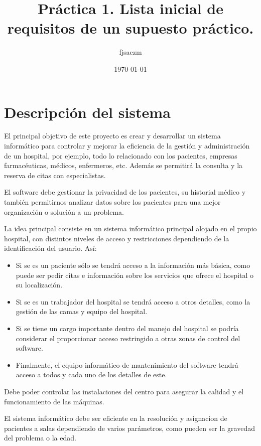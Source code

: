 \documentclass[11pt]{article}
\author{fjsaezm}
\date{\today}
\title{Práctica 1. Lista inicial de requisitos de un supuesto práctico.}
\begin{document}
\maketitle
\tableofcontents

\section{Descripción del sistema}
\label{sec-1}

El principal objetivo de este proyecto es crear y desarrollar un sistema informático para controlar y mejorar la eficiencia de la gestión y administración de un hospital, por ejemplo, todo lo relacionado con los pacientes, empresas farmacéuticas, médicos, enfermeros, etc. Además se permitirá la consulta y la reserva de citas con especialistas.

El software debe gestionar la privacidad de los pacientes, su historial médico y también permitirnos analizar datos sobre los pacientes para una mejor organización o solución a un problema.

La idea principal consiste en un sistema informático principal alojado en el propio hospital, con distintos niveles de acceso y restricciones dependiendo de la identificación del usuario. Así:

\begin{itemize}
\item Si se es un paciente sólo se tendrá acceso a la información más básica, como puede ser pedir citas e información sobre los servicios que ofrece el hospital o su localización.
\item Si se es un trabajador del hospital se tendrá acceso a otros detalles, como la gestión de las camas y equipo del hospital.
\item Si se tiene un cargo importante dentro del manejo del hospital se podría considerar el proporcionar acceso restringido a otras zonas de control del software.
\item Finalmente, el equipo informático de mantenimiento del software tendrá acceso a todos y cada uno de los detalles de este.
\end{itemize}

Debe poder controlar las instalaciones del centro para asegurar la calidad y el funcionamiento de las máquinas.

El sistema informático debe ser eficiente en la resolución y asignacion de pacientes a salas  dependiendo de varios parámetros, como pueden ser la gravedad del problema o la edad.
\end{document}
